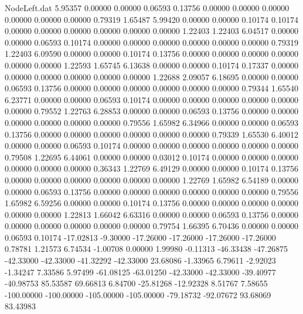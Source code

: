 \begin{filecontents}{NodeLeft.dat}
   5.95357    0.00000    0.00000     0.06593    0.13756    0.00000    0.00000    0.00000    0.00000    0.00000    0.00000    0.79319    1.65487
   5.99420    0.00000    0.00000     0.10174    0.10174    0.00000    0.00000    0.00000    0.00000    0.00000    0.00000    1.22403    1.22403
   6.04517    0.00000    0.00000     0.06593    0.10174    0.00000    0.00000    0.00000    0.00000    0.00000    0.00000    0.79319    1.22403
   6.09590    0.00000    0.00000     0.10174    0.13756    0.00000    0.00000    0.00000    0.00000    0.00000    0.00000    1.22593    1.65745
   6.13638    0.00000    0.00000     0.10174    0.17337    0.00000    0.00000    0.00000    0.00000    0.00000    0.00000    1.22688    2.09057
   6.18695    0.00000    0.00000     0.06593    0.13756    0.00000    0.00000    0.00000    0.00000    0.00000    0.00000    0.79344    1.65540
   6.23771    0.00000    0.00000     0.06593    0.10174    0.00000    0.00000    0.00000    0.00000    0.00000    0.00000    0.79552    1.22763
   6.28853    0.00000    0.00000     0.06593    0.13756    0.00000    0.00000    0.00000    0.00000    0.00000    0.00000    0.79556    1.65982
   6.34966    0.00000    0.00000     0.06593    0.13756    0.00000    0.00000    0.00000    0.00000    0.00000    0.00000    0.79339    1.65530
   6.40012    0.00000    0.00000     0.06593    0.10174    0.00000    0.00000    0.00000    0.00000    0.00000    0.00000    0.79508    1.22695
   6.44061    0.00000    0.00000     0.03012    0.10174    0.00000    0.00000    0.00000    0.00000    0.00000    0.00000    0.36343    1.22769
   6.49129    0.00000    0.00000     0.10174    0.13756    0.00000    0.00000    0.00000    0.00000    0.00000    0.00000    1.22769    1.65982
   6.54189    0.00000    0.00000     0.06593    0.13756    0.00000    0.00000    0.00000    0.00000    0.00000    0.00000    0.79556    1.65982
   6.59256    0.00000    0.00000     0.10174    0.13756    0.00000    0.00000    0.00000    0.00000    0.00000    0.00000    1.22813    1.66042
   6.63316    0.00000    0.00000     0.06593    0.13756    0.00000    0.00000    0.00000    0.00000    0.00000    0.00000    0.79754    1.66395
   6.70436    0.00000    0.00000     0.06593    0.10174  -17.02813   -9.30000  -17.26000  -17.26000  -17.26000  -17.26000    0.78781    1.21573
   6.74534   -1.00708    0.00000     1.99980   -0.11313  -46.33438  -47.26875  -42.33000  -42.33000  -41.32292  -42.33000   23.68086   -1.33965
   6.79611   -2.92023   -1.34247     7.33586    5.97499  -61.08125  -63.01250  -42.33000  -42.33000  -39.40977  -40.98753   85.53587   69.66813
   6.84700  -25.81268  -12.92328     8.51767    7.58655 -100.00000 -100.00000 -105.00000 -105.00000  -79.18732  -92.07672   93.68069   83.43983

\end{filecontents}

